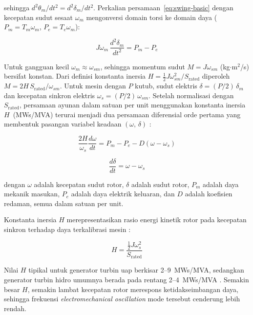 sehingga $d^2\theta_m/dt^2 = d^2\delta_m/dt^2$. Perkalian persamaan~\eqref{eq:swing-basic}
dengan kecepatan sudut sesaat $\omega_m$ mengonversi domain torsi ke domain daya
($P_m = T_m\omega_m$, $P_e = T_e\omega_m$):

\begin{equation}
  J\omega_m\,\frac{d^2\delta_m}{dt^2} = P_m - P_e
  \label{eq:swing-power}
\end{equation}

Untuk gangguan kecil $\omega_m \approx \omega_{sm}$, sehingga momentum sudut
$M = J\omega_{sm}$ (kg$\cdot$m$^2$/s) bersifat konstan. Dari definisi konstanta inersia
$H = \tfrac{1}{2}J\omega_{sm}^2 / S_{\text{rated}}$ diperoleh $M = 2H\,S_{\text{rated}}/\omega_{sm}$.
Untuk mesin dengan $P$ kutub, sudut elektris $\delta = (P/2)\,\delta_m$ dan kecepatan
sinkron elektris $\omega_s = (P/2)\,\omega_{sm}$. Setelah normalisasi dengan
$S_{\text{rated}}$, persamaan ayunan dalam satuan per unit menggunakan konstanta inersia
$H$~(MWs/MVA) terurai menjadi dua persamaan diferensial orde pertama yang membentuk
pasangan variabel keadaan $(\omega,\,\delta)$ \cite{sauer2006power}:

\begin{equation}
  \frac{2H}{\omega_s}\frac{d\omega}{dt} = P_m - P_e - D(\omega - \omega_s)
  \label{eq:swing-pu}
\end{equation}

\begin{equation}
  \frac{d\delta}{dt} = \omega - \omega_s
  \label{eq:swing-delta}
\end{equation}

dengan $\omega$ adalah kecepatan sudut rotor, $\delta$ adalah sudut rotor, $P_m$ adalah
daya mekanik masukan, $P_e$ adalah daya elektrik keluaran, dan $D$ adalah koefisien
redaman, semua dalam satuan per unit.

Konstanta inersia $H$ merepresentasikan rasio energi kinetik rotor pada kecepatan
sinkron terhadap daya terkalibrasi mesin \cite{sauer2006power}:

\begin{equation}
  H = \frac{\tfrac{1}{2}J\omega_s^2}{S_{\text{rated}}}
  \label{eq:H-def}
\end{equation}

Nilai $H$ tipikal untuk generator turbin uap berkisar 2--9~MWs/MVA, sedangkan
generator turbin hidro umumnya berada pada rentang 2--4~MWs/MVA \cite{kundur1994power}.
Semakin besar $H$, semakin lambat kecepatan rotor merespons ketidakseimbangan daya,
sehingga frekuensi \textit{electromechanical oscillation} mode tersebut cenderung lebih rendah.

